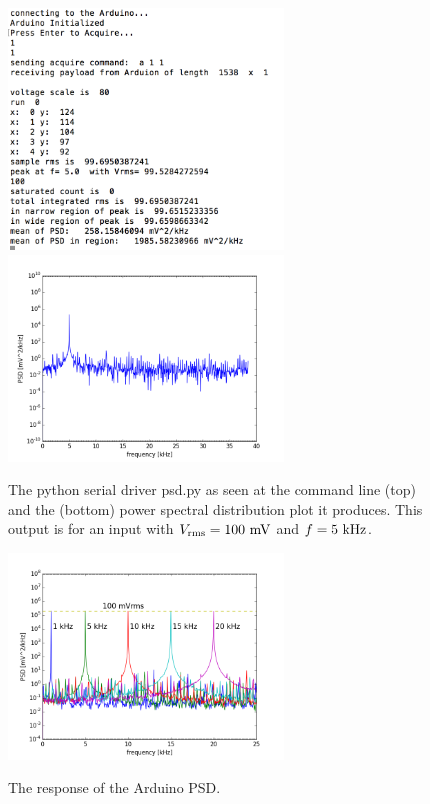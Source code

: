 \documentclass[12pt]{article}
\begin{document}
\begin{figure}[htbp]
\begin{center}
{\includegraphics[width=0.65\textwidth]{figs/psd_driver.png}}\\
{\includegraphics[width=0.65\textwidth]{figs/psd_5k.png}}
\end{center}
\caption{\label{fig:driver}  The python serial driver psd.py as seen at the command line (top) and the (bottom) power spectral distribution plot it produces.  This output is for an input with $V_{\rm rms} = 100~\rm mV$ and $f=5~\rm kHz$.
}\end{figure}

\begin{figure}[htbp]
\begin{center}
{\includegraphics[width=0.65\textwidth]{figs/response.png}}
\end{center}
\caption{\label{fig:response}  The response of the Arduino PSD.}\end{figure}
\end{document}

